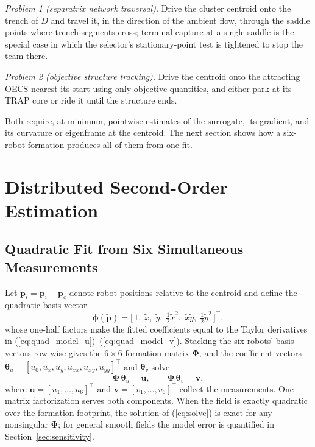 \documentclass[lettersize,journal]{IEEEtran}
\begin{document}
\emph{Problem 1 (separatrix network traversal).} Drive the cluster
centroid onto the trench of $D$ and travel it, in the direction of the
ambient flow, through the saddle points where trench segments cross;
terminal capture at a single saddle is the special case in which the
selector's stationary-point test is tightened to stop the team there.

\emph{Problem 2 (objective structure tracking).} Drive the centroid
onto the attracting OECS nearest its start using only objective
quantities, and either park at its TRAP core or ride it until the
structure ends.

Both require, at minimum, pointwise estimates of the surrogate, its
gradient, and its curvature or eigenframe at the centroid. The next
section shows how a six-robot formation produces all of them from one
fit.


\section{Distributed Second-Order Estimation}
\label{sec:estimation}

\subsection{Quadratic Fit from Six Simultaneous Measurements}

Let $\tilde{\mathbf{p}}_i = \mathbf{p}_i - \mathbf{p}_c$ denote robot
positions relative to the centroid and define the quadratic basis vector
\begin{equation}
    \boldsymbol{\phi}(\tilde{\mathbf{p}}) =
    \bigl[\,1, \; \tilde{x}, \; \tilde{y}, \; \tfrac{1}{2}\tilde{x}^2, \;
    \tilde{x}\tilde{y}, \; \tfrac{1}{2}\tilde{y}^2\,\bigr]^\top,
    \label{eq:basis}
\end{equation}
whose one-half factors make the fitted coefficients equal to the Taylor
derivatives in (\ref{eq:quad_model_u})--(\ref{eq:quad_model_v}).
Stacking the six robots' basis vectors row-wise gives the $6 \times 6$
formation matrix $\boldsymbol{\Phi}$, and the coefficient vectors
$\boldsymbol{\theta}_u = [u_0, u_x, u_y, u_{xx}, u_{xy}, u_{yy}]^\top$
and $\boldsymbol{\theta}_v$ solve
\begin{equation}
    \boldsymbol{\Phi}\,\boldsymbol{\theta}_u = \mathbf{u}, \qquad
    \boldsymbol{\Phi}\,\boldsymbol{\theta}_v = \mathbf{v},
    \label{eq:solve}
\end{equation}
where $\mathbf{u} = [u_1, \ldots, u_6]^\top$ and $\mathbf{v} = [v_1,
\ldots, v_6]^\top$ collect the measurements. One matrix factorization
serves both components. When the field is exactly quadratic over the
formation footprint, the solution of (\ref{eq:solve}) is exact for any
nonsingular $\boldsymbol{\Phi}$; for general smooth fields the model
error is quantified in Section~\ref{sec:sensitivity}.
\end{document}
